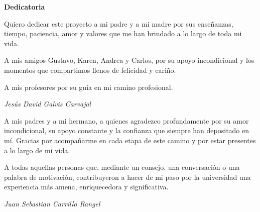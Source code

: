 \begin{center}
\textbf{Dedicatoria}\par
\end{center}

\vspace{\baselineskip}

    Quiero dedicar este proyecto a mi padre y a mi madre por sus enseñanzas, tiempo, paciencia, amor y valores que me han brindado a lo largo de toda mi vida.

    A mis amigos Gustavo, Karen, Andrea y Carlos, por su apoyo incondicional y los momentos que compartimos llenos de felicidad y cariño.

    A mis profesores por su guía en mi camino profesional.

    \vspace{\baselineskip}

    \textit{Jesús David Galvis Carvajal}

    \vspace{\baselineskip}

    A mis padres y a mi hermano, a quienes agradezco profundamente por su amor incondicional, su apoyo constante y la confianza que siempre han depositado en mí. Gracias por acompañarme en cada etapa de este camino y por estar presentes a lo largo de mi vida.

    A todas aquellas personas que, mediante un consejo, una conversación o una palabra de motivación, contribuyeron a hacer de mi paso por la universidad una experiencia más amena, enriquecedora y significativa.

    \vspace{\baselineskip}

    \textit{Juan Sebastian Carrillo Rangel}